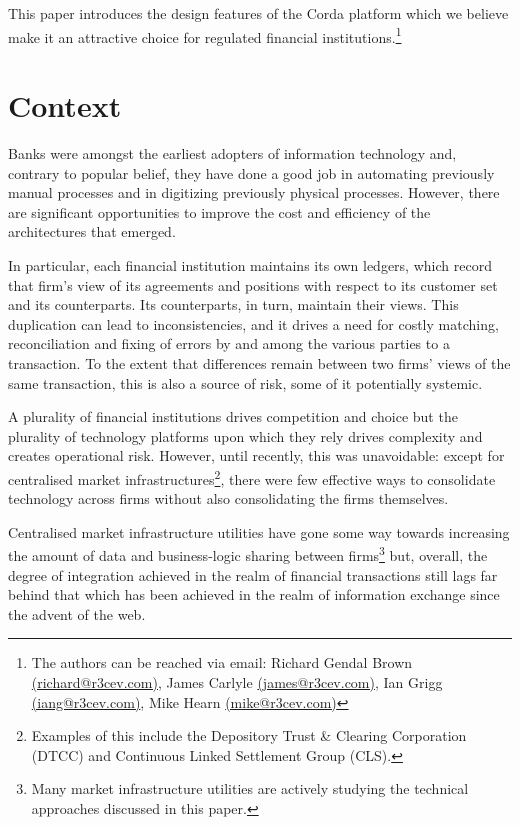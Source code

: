 \documentclass{article}
\begin{document}
This paper introduces the design features of the Corda platform which we believe make it an attractive choice for regulated financial institutions.\footnote{The authors can be reached via email: Richard Gendal Brown \href{mailto:richard@r3cev.com}{(richard@r3cev.com)}, James Carlyle \href{mailto:james@r3cev.com}{(james@r3cev.com)}, Ian Grigg \href{mailto:iang@r3cev.com}{(iang@r3cev.com)}, Mike Hearn \href{mailto:mike@r3cev.com}{(mike@r3cev.com)}}

\section{Context}
Banks were amongst the earliest adopters of information technology and, contrary to popular belief, they have done a good job in automating previously manual processes and in digitizing previously physical processes. However, there are significant opportunities to improve the cost and efficiency of the architectures that emerged. 

In particular, each financial institution maintains its own ledgers, which record that firm's view of its agreements and positions with respect to its customer set and its counterparts. Its counterparts, in turn, maintain their views. This duplication can lead to inconsistencies, and it drives a need for costly matching, reconciliation and fixing of errors by and among the various parties to a transaction. To the extent that differences remain between two firms' views of the same transaction, this is also a source of risk, some of it potentially systemic.

A plurality of financial institutions drives competition and choice but the plurality of technology platforms upon which they rely drives complexity and creates operational risk. However, until recently, this was unavoidable: except for centralised market infrastructures\footnote{Examples of this include the Depository Trust \& Clearing Corporation (DTCC) and Continuous Linked Settlement Group (CLS).}, there were few effective ways to consolidate technology across firms without also consolidating the firms themselves.

Centralised market infrastructure utilities have gone some way towards increasing the amount of data and business-logic sharing between firms\footnote{Many market infrastructure utilities are actively studying the technical approaches discussed in this paper\cite{DTCC}.} but, overall, the degree of integration achieved in the realm of financial transactions still lags far behind that which has been achieved in the realm of information exchange since the advent of the web. \cite{IT}
\end{document}
